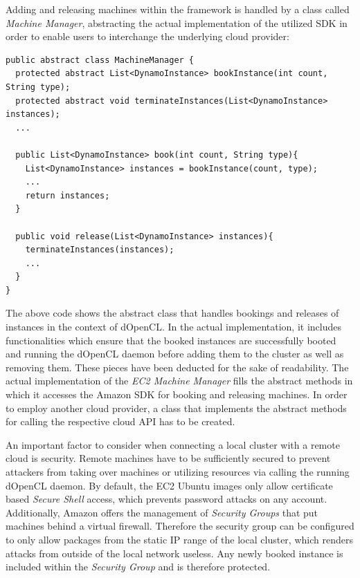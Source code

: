 Adding and releasing machines within the framework is handled by a class called \textit{Machine Manager}, abstracting the actual implementation of the utilized SDK in order to enable users to interchange the underlying cloud provider:


\begin{lstlisting}[caption=Machine Manager Abstract Implementation,captionpos=b]
public abstract class MachineManager {
  protected abstract List<DynamoInstance> bookInstance(int count, String type);
  protected abstract void terminateInstances(List<DynamoInstance> instances);
  ...

  public List<DynamoInstance> book(int count, String type){
    List<DynamoInstance> instances = bookInstance(count, type);
    ...
    return instances;
  }

  public void release(List<DynamoInstance> instances){
    terminateInstances(instances);
    ...
  }
}
\end{lstlisting}

The above code shows the abstract class that handles bookings and releases of instances in the context of dOpenCL. In the actual implementation, it includes functionalities which ensure that the booked instances are successfully booted and running the dOpenCL daemon before adding them to the cluster as well as removing them. These pieces have been deducted for the sake of readability. The actual implementation of the \textit{EC2 Machine Manager} fills the abstract methods in which it accesses the Amazon SDK for booking and releasing machines. In order to employ another cloud provider, a class that implements the abstract methods for calling the respective cloud API has to be created.

An important factor to consider when connecting a local cluster with a remote cloud is security. Remote machines have to be sufficiently secured to prevent attackers from taking over machines or utilizing resources via calling the running dOpenCL daemon. By default, the EC2 Ubuntu images only allow certificate based \textit{Secure Shell} access, which prevents password attacks on any account. Additionally, Amazon offers the management of \textit{Security Groups} that put machines behind a virtual firewall. Therefore the security group can be configured to only allow packages from the static IP range of the local cluster, which renders attacks from outside of the local network useless. Any newly booked instance is included within the \textit{Security Group} and is therefore protected.

